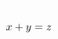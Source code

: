 \documentclass[12pt,border=2pt,preview]{standalone}
\begin{document}
\begin{align*}
\color{white}a+b &\color{white}= c \\
\color{black}x+y &\color{black}= z
\end{align*}
\end{document}
